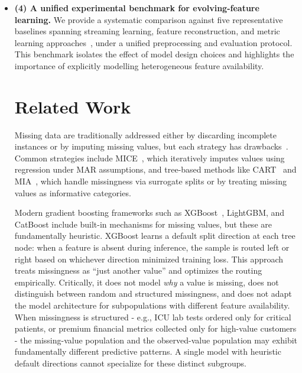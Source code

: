 \documentclass[sigconf]{acmart}
\begin{document}
\begin{itemize}
\item \textbf{(4) A unified experimental benchmark for evolving-feature learning.}
We provide a systematic comparison against five representative baselines spanning streaming learning, feature reconstruction, and metric learning approaches~\cite{montiel2020axgb,he2021pufe,he2019ocds,dong2021eml,chen2024gbdtil}, under a unified preprocessing and evaluation protocol. This benchmark isolates the effect of model design choices and highlights the importance of explicitly modelling heterogeneous feature availability.

\section{Related Work}
Missing data are traditionally addressed either by discarding incomplete instances or by imputing missing values, but each strategy has drawbacks~\cite{chen2016xgboost}. Common strategies include MICE~\cite{vanbuuren2011mice}, which iteratively imputes values using regression under MAR assumptions, and tree-based methods like CART~\cite{loh2011cart} and MIA~\cite{twala2008mia}, which handle missingness via surrogate splits or by treating missing values as informative categories.

Modern gradient boosting frameworks such as XGBoost~\cite{chen2016xgboost}, LightGBM, and CatBoost include built-in mechanisms for missing values, but these are fundamentally heuristic. XGBoost learns a default split direction at each tree node: when a feature is absent during inference, the sample is routed left or right based on whichever direction minimized training loss. This approach treats missingness as ``just another value'' and optimizes the routing empirically. Critically, it does not model \textit{why} a value is missing, does not distinguish between random and structured missingness, and does not adapt the model architecture for subpopulations with different feature availability. When missingness is structured - e.g., ICU lab tests ordered only for critical patients, or premium financial metrics collected only for high-value customers - the missing-value population and the observed-value population may exhibit fundamentally different predictive patterns. A single model with heuristic default directions cannot specialize for these distinct subgroups.


\end{itemize}
\end{document}
